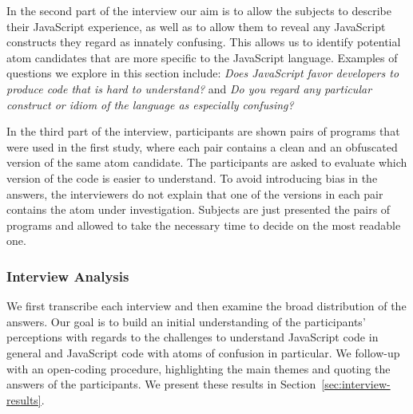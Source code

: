 In the second part of the interview our aim is to allow the subjects to describe their JavaScript experience, as well as to allow them to reveal any JavaScript constructs they regard as innately confusing. This allows us to identify potential atom candidates that are more specific to the JavaScript language. Examples of questions we explore in this section include: \emph{Does JavaScript favor developers to produce code that is hard to understand?} and \emph{Do you regard any particular construct or idiom of the language as especially confusing?}

In the third part of the interview, participants are shown pairs of programs that were used in the first study, where each pair contains a clean and an obfuscated version of the same atom candidate. The participants 
are asked to evaluate which version of the code is easier to understand. To avoid introducing bias in the answers, the interviewers do not explain that one of the versions in each pair contains the atom under investigation. Subjects are just presented the pairs of programs and allowed to take the necessary time to decide on the most readable one.

\subsubsection*{Interview Analysis}

We first transcribe each interview and then examine the broad distribution of the answers. Our goal is to build an initial understanding of the participants' perceptions with regards to the challenges to understand JavaScript code in general and JavaScript code with atoms of confusion in particular. We follow-up with an open-coding procedure, highlighting the main themes and quoting the answers of the participants. We present these results in Section~\ref{sec:interview-results}. 




